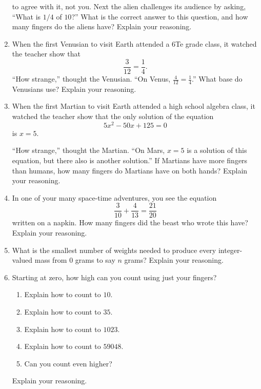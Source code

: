 \begin{problems}
\begin{enumerate}
  to agree with it, not you. Next the alien challenges its audience by
  asking, ``What is $1/4$ of $10$?'' What is the correct answer to
  this question, and how many fingers do the aliens have? Explain your
  reasoning.
\item When the first Venusian to visit Earth attended a 6Te grade
  class, it watched the teacher show that
\[
\frac{3}{12} = \frac{1}{4}.
\]
``How strange,'' thought the Venusian. ``On Venus, $\frac{4}{12} =
\frac{1}{4}$.'' What base do Venusians use? Explain your reasoning.
\item When the first Martian to visit Earth attended a high school
  algebra class, it watched the teacher show that the only solution of
  the equation
\[
5x^2-50x+125 = 0
\]
is $x = 5$.

``How strange,'' thought the Martian. ``On Mars, $x = 5$ is a solution
of this equation, but there also is another solution.'' If Martians
have more fingers than humans, how many fingers do Martians have on both hands?
Explain your reasoning.


\item In one of your many space-time adventures, you see the equation
\[
\frac{3}{10} + \frac{4}{13} = \frac{21}{20}
\]
written on a napkin. How many fingers did the beast who wrote this
have? Explain your reasoning.
\item What is the smallest number of weights needed to produce every
  integer-valued mass from $0$ grams to say $n$ grams? Explain your
  reasoning.
\item Starting at zero, how high can you count using just your
  fingers?
\begin{enumerate}
\item Explain how to count to $10$.
\item Explain how to count to $35$.
\item Explain how to count to $1023$.
\item Explain how to count to $59048$.
\item Can you count even higher?
\end{enumerate}
Explain your reasoning.
\end{enumerate}

\end{problems}









